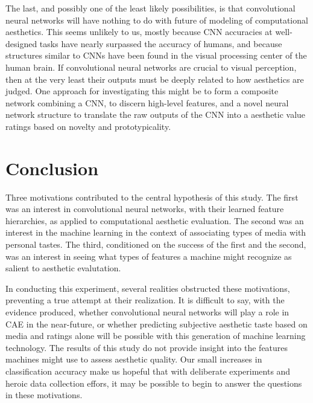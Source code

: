 \documentclass[midd]{thesis}
\begin{document}
The last, and possibly one of the least likely possibilities, is that convolutional neural networks will have nothing to do with future of modeling of computational aesthetics. This seems unlikely to us, mostly because CNN accuracies at well-designed tasks have nearly surpassed the accuracy of humans, and because structures similar to CNNs have been found in the visual processing center of the human brain. If convolutional neural networks are crucial to visual perception, then at the very least their outputs must be deeply related to how aesthetics are judged. One approach for investigating this might be to form a composite network combining a CNN, to discern high-level features, and a novel neural network structure to translate the raw outputs of the CNN into a aesthetic value ratings based on novelty and prototypicality.





























\chapter{Conclusion}

Three motivations contributed to the central hypothesis of this study. The first was an interest in convolutional neural networks, with their learned feature hierarchies, as applied to computational aesthetic evaluation. The second was an interest in the machine learning in the context of associating types of media with personal tastes. The third, conditioned on the success of the first and the second, was an interest in seeing what types of features a machine might recognize as salient to aesthetic evalutation.

In conducting this experiment, several realities obstructed these motivations, preventing a true attempt at their realization. It is difficult to say, with the evidence produced, whether convolutional neural networks will play a role in CAE in the near-future, or whether predicting subjective aesthetic taste based on media and ratings alone will be possible with this generation of machine learning technology. The results of this study do not provide insight into the features machines might use to assess aesthetic quality. Our small increases in classification accuracy make us hopeful that with deliberate experiments and heroic data collection effors, it may be possible to begin to answer the questions in these motivations. 
\end{document}
